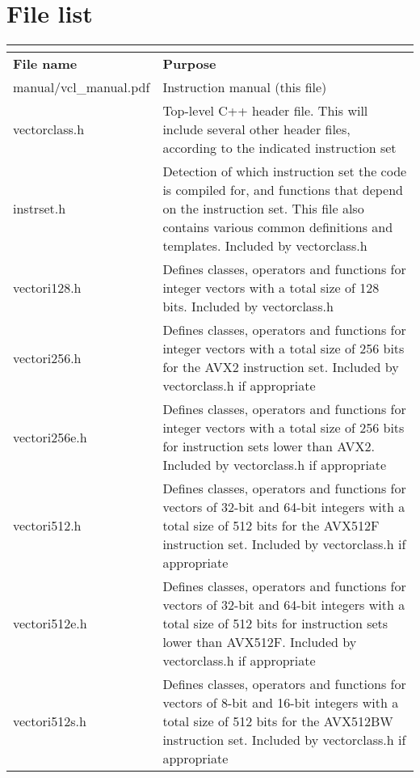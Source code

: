 \documentclass[vcl_manual.tex]{subfiles}
\begin{document}
\section{File list}
\flushleft

\begin{longtable}[l]{|p{40mm}|p{100mm}|}
\endfirsthead
\label{table:fileList} \\
\endhead
\hline
\bfseries File name & \bfseries Purpose \\ \hline
manual/vcl\_manual.pdf & Instruction manual (this file) \\ \hline

vectorclass.h & Top-level C++ header file. This will include several other header files, according to the indicated instruction set \\ \hline

instrset.h & Detection of which instruction set the code is compiled for, 
and functions that depend on the instruction set. This file also contains various common definitions and templates. Included by vectorclass.h \\ \hline

vectori128.h & Defines classes, operators and functions for integer vectors with a total size of 128 bits. Included by vectorclass.h \\ \hline

vectori256.h & Defines classes, operators and functions for integer vectors with a total size of 256 bits for the AVX2 instruction set. Included by vectorclass.h if appropriate \\ \hline

vectori256e.h & Defines classes, operators and functions for integer vectors with a total size of 256 bits for instruction sets lower than AVX2. Included by vectorclass.h if appropriate \\ \hline

vectori512.h & Defines classes, operators and functions for vectors of 32-bit and 64-bit integers with a total size of 512 bits for the AVX512F instruction set. Included by vectorclass.h if appropriate \\ \hline

vectori512e.h & Defines classes, operators and functions for vectors of 32-bit and 64-bit integers with a total size of 512 bits for instruction sets lower than AVX512F. Included by vectorclass.h if appropriate \\ \hline

vectori512s.h & Defines classes, operators and functions for vectors of 8-bit and 16-bit integers with a total size of 512 bits for the AVX512BW instruction set. Included by vectorclass.h if appropriate \\ \hline


\end{longtable}
\end{document}

